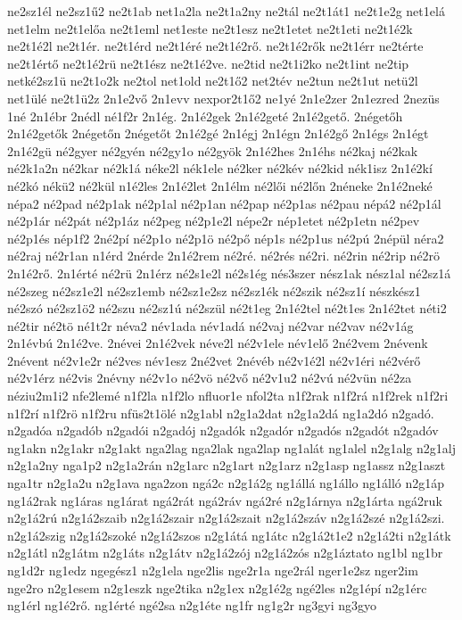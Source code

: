 {ne2sz1él
ne2sz1ű2
ne2t1ab
net1a2la
ne2t1a2ny
ne2tál
ne2t1át1
ne2t1e2g
net1elá
net1elm
ne2t1előa
ne2t1eml
net1este
ne2t1esz
ne2t1etet
ne2t1eti
ne2t1é2k
ne2t1é2l
ne2t1ér.
ne2t1érd
ne2t1éré
ne2t1é2rő.
ne2t1é2rők
ne2t1érr
ne2térte
ne2t1értő
ne2t1é2rü
ne2t1ész
ne2t1é2ve.
ne2tid
ne2t1i2ko
ne2t1int
ne2tip
netké2sz1ü
ne2t1o2k
ne2tol
net1old
ne2t1ő2
net2tév
ne2tun
ne2t1ut
netü2l
net1ülé
ne2t1ü2z
2n1e2vő
2n1evv
nexpor2t1ő2
ne1yé
2n1e2zer
2n1ezred
2nezüs
1né
2n1ébr
2nédl
né1f2r
2n1ég.
2n1é2gek
2n1é2geté
2n1é2gető.
2négetőh
2n1é2getők
2négetőn
2négetőt
2n1é2gé
2n1égj
2n1égn
2n1é2gő
2n1égs
2n1égt
2n1é2gü
né2gyer
né2gyén
né2gy1o
né2gyök
2n1é2hes
2n1éhs
né2kaj
né2kak
né2k1a2n
né2kar
né2k1á
néke2l
nék1ele
né2ker
né2kév
né2kid
nék1isz
2n1é2kí
né2kó
nékü2
né2kül
n1é2les
2n1é2let
2n1élm
né2lői
né2lőn
2néneke
2n1é2neké
népa2
né2pad
né2p1ak
né2p1al
né2p1an
né2pap
né2p1as
né2pau
népá2
né2p1ál
né2p1ár
né2pát
né2p1áz
né2peg
né2p1e2l
népe2r
nép1etet
né2p1etn
né2pev
né2p1és
nép1f2
2né2pí
né2p1o
né2p1ö
né2pő
nép1s
né2p1us
né2pú
2népül
néra2
né2raj
né2r1an
n1érd
2nérde
2n1é2rem
né2ré.
né2rés
né2ri.
né2rin
né2rip
né2rö
2n1é2rő.
2n1érté
né2rü
2n1érz
né2s1e2l
né2s1ég
nés3szer
nész1ak
nész1al
né2sz1á
né2szeg
né2sz1e2l
né2sz1emb
né2sz1e2sz
né2sz1ék
né2szik
né2sz1í
nészkész1
né2szó
né2sz1ö2
né2szu
né2sz1ú
né2szül
né2t1eg
2n1é2tel
né2t1es
2n1é2tet
néti2
né2tir
né2tö
né1t2r
néva2
név1ada
név1adá
né2vaj
né2var
né2vav
né2v1ág
2n1évbú
2n1é2ve.
2névei
2n1é2vek
néve2l
né2v1ele
név1elő
2né2vem
2névenk
2névent
né2v1e2r
né2ves
név1esz
2né2vet
2névéb
né2v1é2l
né2v1éri
né2vérő
né2v1érz
né2vis
2névny
né2v1o
né2vö
né2vő
né2v1u2
né2vú
né2vün
né2za
néziu2m1i2
nfe2lemé
n1f2la
n1f2lo
nfluor1e
nfol2ta
n1f2rak
n1f2rá
n1f2rek
n1f2ri
n1f2rí
n1f2rö
n1f2ru
nfüs2t1ölé
n2g1abl
n2g1a2dat
n2g1a2dá
ng1a2dó
n2gadó.
n2gadóa
n2gadób
n2gadói
n2gadój
n2gadók
n2gadór
n2gadós
n2gadót
n2gadóv
ng1akn
n2g1akr
n2g1akt
nga2lag
nga2lak
nga2lap
ng1alát
ng1alel
n2g1alg
n2g1alj
n2g1a2ny
nga1p2
n2g1a2rán
n2g1arc
n2g1art
n2g1arz
n2g1asp
ng1assz
n2g1aszt
nga1tr
n2g1a2u
n2g1ava
nga2zon
ngá2c
n2g1á2g
ng1állá
ng1állo
ng1álló
n2g1áp
ng1á2rak
ng1áras
ng1árat
ngá2rát
ngá2ráv
ngá2ré
n2g1árnya
n2g1árta
ngá2ruk
n2g1á2rú
n2g1á2szaib
n2g1á2szair
n2g1á2szait
n2g1á2száv
n2g1á2szé
n2g1á2szi.
n2g1á2szig
n2g1á2szoké
n2g1á2szos
n2g1átá
ng1átc
n2g1á2t1e2
n2g1á2ti
n2g1átk
n2g1átl
n2g1átm
n2g1áts
n2g1átv
n2g1á2zój
n2g1á2zós
n2g1áztato
ng1bl
ng1br
ng1d2r
ng1edz
ngegész1
n2g1ela
nge2lis
nge2r1a
nge2rál
nger1e2sz
nger2im
nge2ro
n2g1esem
n2g1eszk
nge2tika
n2g1ex
n2g1é2g
ngé2les
n2g1épí
n2g1érc
ng1érl
ng1é2rő.
ng1érté
ngé2sa
n2g1éte
ng1fr
ng1g2r
ng3gyi
ng3gyo
}
